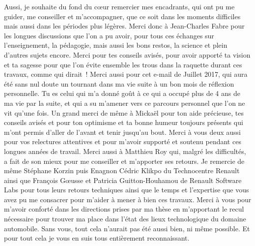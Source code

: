 \documentclass[french, a4paper, 11pt, twoside, pdftex]{StyleThese}
\begin{document}
{	Aussi, je souhaite du fond du cœur remercier mes encadrants, qui ont pu me guider, me conseiller et m'accompagner, que ce soit dans les moments difficiles mais aussi dans les périodes plus légères. 
	Merci donc à Jean-Charles Fabre pour les longues discussions que l'on a pu avoir, pour tous ces échanges sur l'enseignement, la pédagogie, mais aussi les bons restos, la science et plein d'autres sujets encore. Merci pour tes conseils avisés, pour avoir apporté ta vision et ta sagesse pour que l'on évite ensemble les trous dans la raquette durant ces travaux, comme qui dirait~! Merci aussi pour cet e-mail de Juillet 2017, qui aura été sans nul doute un tournant dans ma vie suite à un bon mois de réflexion personnelle. Tu es celui qui m'a donné goût à ce qui a occupé plus de 4 ans de ma vie par la suite, et qui a su m'amener vers ce parcours personnel que l'on ne vit qu'une fois.
	Un grand merci de même à Mickaël pour ton aide précieuse, tes conseils avisés et pour ton optimisme et ta bonne humeur toujours présents qui m'ont permis d'aller de l'avant et tenir jusqu'au bout. Merci à vous deux aussi pour vos relectures attentives et pour m'avoir supporté et soutenu pendant ces longues années de travail.
	Merci aussi à Matthieu Roy qui, malgré les difficultés, a fait de son mieux pour me conseiller et m'apporter ses retours. Je remercie de même Stéphane Korzin puis Enagnon Cédric Klikpo du Technocentre Renault ainsi que François Gœusse et Patricia Guitton-Houhamou de Renault Software Labs pour tous leurs retours techniques ainsi que le temps et l'expertise que vous avez pu me consacrer pour m'aider à mener à bien ces travaux. Merci à vous pour m'avoir conforté dans les directions prises par ma thèse en m'apportant le recul nécessaire pour trouver ma place dans l'état des lieux technologique du domaine automobile. 
	Sans vous, tout cela n'aurait pas été aussi bien, ni même possible. Et pour tout cela je vous en suis tous entièrement reconnaissant.
	
	\renewcommand{\alertColor}{\textcolor{black}}
}
\end{document}
